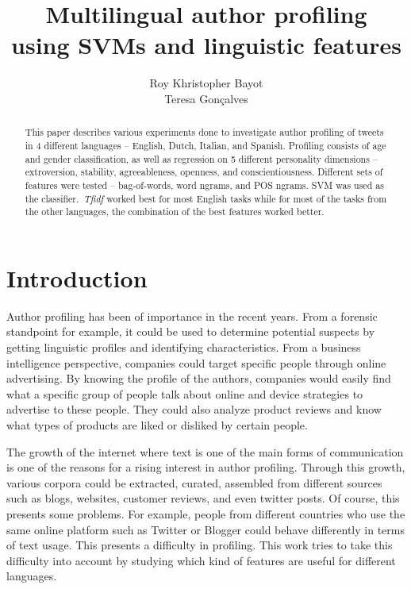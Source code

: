 \documentclass[a4paper]{llncs}
\begin{document}
\title{Multilingual author profiling \\using SVMs and linguistic features}
\titlerunning{}
\author{}
\institute{}
\author{Roy Khristopher Bayot\\Teresa Gonçalves}

\maketitle
\begin{abstract}
  This paper describes various experiments done to investigate author profiling of tweets in 4 different languages – English, Dutch, Italian, and Spanish. Profiling consists of age and gender classification, as well as regression on 5 different personality dimensions – extroversion, stability, agreeableness, openness, and conscientiousness. Different sets of features were tested – bag-of-words, word ngrams, and POS ngrams. SVM was used as the classifier.~\textit{Tfidf} worked best for most English tasks while for most of the tasks from the other languages, the combination of the best features worked better. 
\end{abstract}

\section{Introduction}
Author profiling has been of importance in the recent years. From a forensic standpoint for example, it could be used to determine potential suspects by getting linguistic profiles and identifying characteristics. From a business intelligence perspective, companies could target specific people through online advertising. By knowing the profile of the authors, companies would easily find what a specific group of people talk about online and device strategies to advertise to these people. They could also analyze product reviews and know what types of products are liked or disliked by certain people. 

The growth of the internet where text is one of the main forms of communication is one of the reasons for a rising interest in author profiling. Through this growth, various corpora could be extracted, curated, assembled from different sources such as blogs, websites, customer reviews, and even twitter posts. Of course, this presents some problems. For example, people from different countries who use the same online platform such as Twitter or Blogger could behave differently in terms of text usage. This presents a difficulty in profiling. This work tries to take this difficulty into account by studying which kind of features are useful for different languages. 
\end{document}
